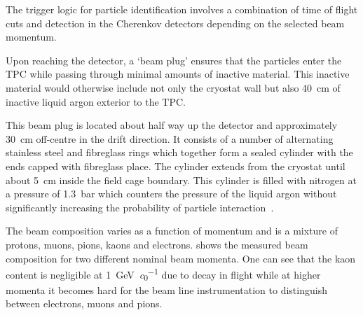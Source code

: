 The trigger logic for particle identification involves a combination of time of flight cuts and detection in the Cherenkov detectors depending on the selected beam momentum.

Upon reaching the detector, a `beam plug' ensures that the particles enter the TPC while passing through minimal amounts of inactive material.
This inactive material would otherwise include not only the cryostat wall but also \SI{40}{\cm} of inactive liquid argon exterior to the TPC.

This beam plug is located about half way up the detector and approximately \SI{30}{\cm} off-centre in the drift direction.
It consists of a number of alternating stainless steel and fibreglass rings which together form a sealed cylinder with the ends capped with fibreglass place.
The cylinder extends from the cryostat until about \SI{5}{\cm} inside the field cage boundary.
This cylinder is filled with nitrogen at a pressure of \SI{1.3}{\bar} which counters the pressure of the liquid argon without significantly increasing the probability of particle interaction~\cite{protodunePerformance}.

The beam composition varies as a function of momentum and is a mixture of protons, muons, pions, kaons and electrons.
 shows the measured beam composition for two different nominal beam momenta.
One can see that the kaon content is negligible at \SI{1}{\GeV\per\clight} due to decay in flight while at higher momenta it becomes hard for the beam line instrumentation to distinguish between electrons, muons and pions.


